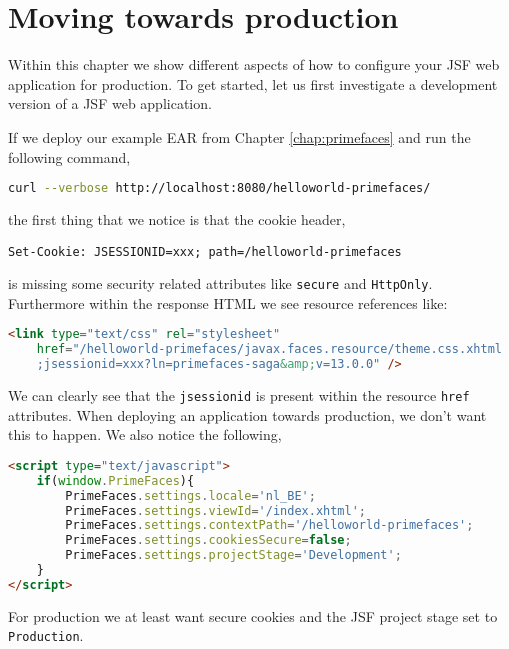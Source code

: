 %

\chapter{Moving towards production}

Within this chapter we show different aspects of how to configure your JSF web application for production.
To get started, let us first investigate a development version of a JSF web application.

If we deploy our example EAR from Chapter \ref{chap:primefaces}  and run the following command,
\begin{lstlisting}[language=bash]
curl --verbose http://localhost:8080/helloworld-primefaces/
\end{lstlisting}
the first thing that we notice is that the cookie header,
\begin{lstlisting}
Set-Cookie: JSESSIONID=xxx; path=/helloworld-primefaces
\end{lstlisting}
is missing some security related attributes like \texttt{secure} and \texttt{HttpOnly}.
Furthermore within the response HTML we see resource references like:
\begin{lstlisting}[language=html]
<link type="text/css" rel="stylesheet"
	href="/helloworld-primefaces/javax.faces.resource/theme.css.xhtml
	;jsessionid=xxx?ln=primefaces-saga&amp;v=13.0.0" />
\end{lstlisting}
We can clearly see that the \texttt{jsessionid} is present within the resource \texttt{href} attributes.
When deploying an application towards production, we don't want this to happen.
We also notice the following,
\begin{lstlisting}[language=html]
<script type="text/javascript">
	if(window.PrimeFaces){
		PrimeFaces.settings.locale='nl_BE';
		PrimeFaces.settings.viewId='/index.xhtml';
		PrimeFaces.settings.contextPath='/helloworld-primefaces';
		PrimeFaces.settings.cookiesSecure=false;
		PrimeFaces.settings.projectStage='Development';
	}
</script>
\end{lstlisting}
For production we at least want secure cookies and the JSF project stage set to \texttt{Production}.

